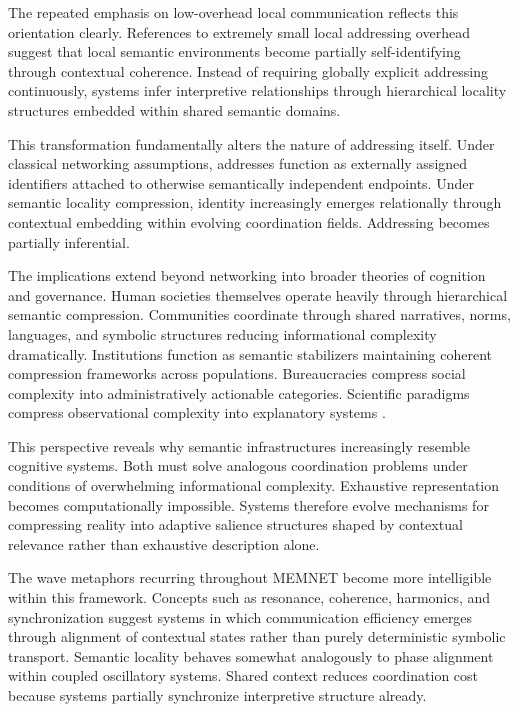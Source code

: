 \documentclass[11pt,a4paper]{article}
\begin{document}
The repeated emphasis on low-overhead local communication reflects this orientation clearly. References to extremely small local addressing overhead suggest that local semantic environments become partially self-identifying through contextual coherence. Instead of requiring globally explicit addressing continuously, systems infer interpretive relationships through hierarchical locality structures embedded within shared semantic domains.

This transformation fundamentally alters the nature of addressing itself. Under classical networking assumptions, addresses function as externally assigned identifiers attached to otherwise semantically independent endpoints. Under semantic locality compression, identity increasingly emerges relationally through contextual embedding within evolving coordination fields. Addressing becomes partially inferential.

The implications extend beyond networking into broader theories of cognition and governance. Human societies themselves operate heavily through hierarchical semantic compression. Communities coordinate through shared narratives, norms, languages, and symbolic structures reducing informational complexity dramatically. Institutions function as semantic stabilizers maintaining coherent compression frameworks across populations. Bureaucracies compress social complexity into administratively actionable categories. Scientific paradigms compress observational complexity into explanatory systems \cite{scott1998}.

This perspective reveals why semantic infrastructures increasingly resemble cognitive systems. Both must solve analogous coordination problems under conditions of overwhelming informational complexity. Exhaustive representation becomes computationally impossible. Systems therefore evolve mechanisms for compressing reality into adaptive salience structures shaped by contextual relevance rather than exhaustive description alone.

The wave metaphors recurring throughout MEMNET become more intelligible within this framework. Concepts such as resonance, coherence, harmonics, and synchronization suggest systems in which communication efficiency emerges through alignment of contextual states rather than purely deterministic symbolic transport. Semantic locality behaves somewhat analogously to phase alignment within coupled oscillatory systems. Shared context reduces coordination cost because systems partially synchronize interpretive structure already.
\end{document}
